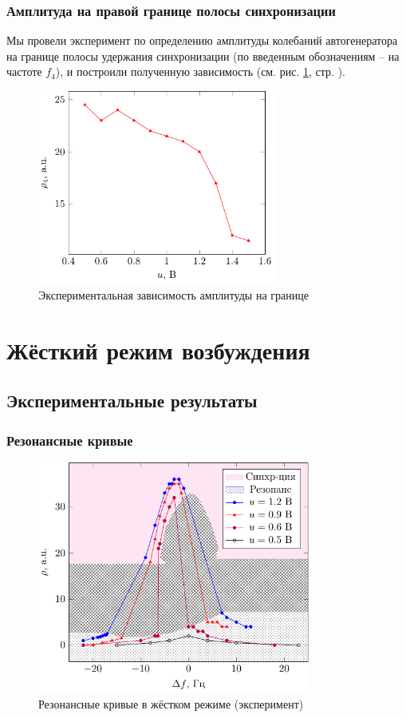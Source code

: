 \documentclass[a4paper,14pt]{extarticle}
\begin{document}
\subsubsection{Амплитуда на правой границе полосы синхронизации}
Мы провели эксперимент по определению амплитуды колебаний автогенератора на границе полосы удержания синхронизации (по введенным обозначениям -- на частоте $f_4$), и построили полученную зависимость (см. рис. \ref{fig:ampl}, стр. \pageref{fig:ampl}).
\begin{figure}[h!]
	\centering
	\includegraphics[width=0.7\textwidth]{plot/ampl.pdf}
	\vspace{-1em}
	\caption{Экспериментальная зависимость амплитуды на границе}
	\label{fig:ampl}
\end{figure}

\newpage
\section{Жёсткий режим возбуждения}
\subsection{Экспериментальные результаты}
\subsubsection{Резонансные кривые}
\begin{figure}[H]
	\centering
	\includegraphics[width=0.8\textwidth]{plot/hard.pdf}
	\vspace{-1em}
	\caption{Резонансные кривые в жёстком режиме (эксперимент)}
	\label{fig:hard}
\end{figure}
\end{document}

